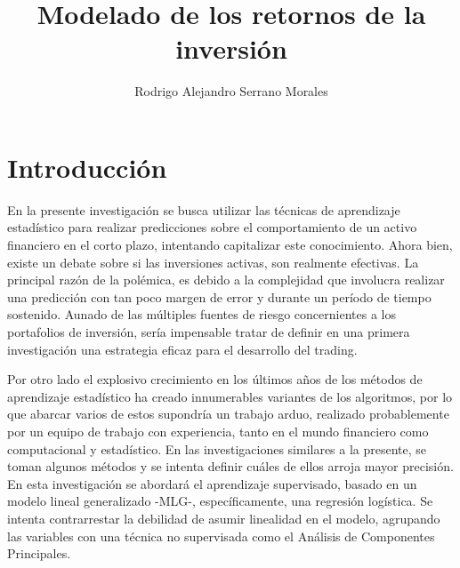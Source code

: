 \documentclass[a4paper,12pt]{Latex/Classes/PhDthesisPSnPDF}
\title{Modelado de los retornos de la inversión}
\author{Rodrigo Alejandro Serrano Morales}
\begin{document}


\maketitle									%

\newpage\renewcommand{\thepage}{\arabic{page}}\setcounter{page}{1} 


\tableofcontents
\listoffigures
\listoftables



\chapter*{Introducción}

En la presente investigación se busca utilizar las técnicas de aprendizaje estadístico para realizar predicciones sobre el comportamiento de un activo financiero en el corto  plazo, intentando capitalizar este conocimiento. Ahora bien, existe un debate sobre si las inversiones activas, son realmente efectivas. La principal razón de la polémica, es debido a la complejidad que involucra realizar una predicción con tan poco margen de error y durante un período de tiempo sostenido. Aunado de las múltiples fuentes de riesgo concernientes a los portafolios de inversión, sería impensable tratar de definir en una primera investigación una estrategia eficaz para el desarrollo del trading.

Por otro lado el explosivo crecimiento en los últimos años de los métodos de aprendizaje estadístico ha creado innumerables variantes de los algoritmos, por lo que abarcar varios de estos supondría un trabajo arduo, realizado probablemente por un equipo de trabajo con experiencia, tanto en el mundo financiero como computacional y estadístico. En las investigaciones similares a la presente, se toman algunos métodos y se intenta definir cuáles de ellos arroja mayor precisión. En esta investigación se abordará el aprendizaje supervisado, basado en un modelo lineal generalizado -MLG-, específicamente, una regresión logística. Se intenta contrarrestar la debilidad de asumir linealidad en el modelo, agrupando las variables con una técnica no supervisada como el Análisis de Componentes Principales.
\end{document}
